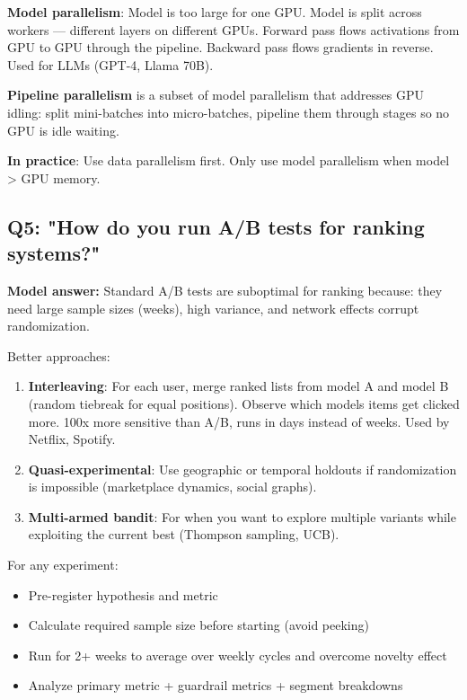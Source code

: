 \documentclass[11pt]{article}
\providecommand{\tightlist}{\setlength{\itemsep}{1pt}\setlength{\parskip}{0pt}}
\begin{document}
\textbf{Model parallelism}: Model is too large for one GPU. Model is split across workers --- different layers on different GPUs. Forward pass flows activations from GPU to GPU through the pipeline. Backward pass flows gradients in reverse. Used for LLMs (GPT-4, Llama 70B).

\textbf{Pipeline parallelism} is a subset of model parallelism that addresses GPU idling: split mini-batches into micro-batches, pipeline them through stages so no GPU is idle waiting.

\textbf{In practice}: Use data parallelism first. Only use model parallelism when model \textgreater{} GPU memory.

\subsection{Q5: "How do you run A/B tests for ranking systems?"}\label{q5-how-do-you-run-ab-tests-for-ranking-systems}

\textbf{Model answer:}
Standard A/B tests are suboptimal for ranking because: they need large sample sizes (weeks), high variance, and network effects corrupt randomization.

Better approaches:

\begin{enumerate}
\def\labelenumi{\arabic{enumi}.}
\item
  \textbf{Interleaving}: For each user, merge ranked lists from model A and model B (random tiebreak for equal positions). Observe which model\textquotesingle s items get clicked more. 100x more sensitive than A/B, runs in days instead of weeks. Used by Netflix, Spotify.
\item
  \textbf{Quasi-experimental}: Use geographic or temporal holdouts if randomization is impossible (marketplace dynamics, social graphs).
\item
  \textbf{Multi-armed bandit}: For when you want to explore multiple variants while exploiting the current best (Thompson sampling, UCB).
\end{enumerate}

For any experiment:

\begin{itemize}
\tightlist
\item
  Pre-register hypothesis and metric
\item
  Calculate required sample size before starting (avoid peeking)
\item
  Run for 2+ weeks to average over weekly cycles and overcome novelty effect
\item
  Analyze primary metric + guardrail metrics + segment breakdowns
\end{itemize}
\end{document}
